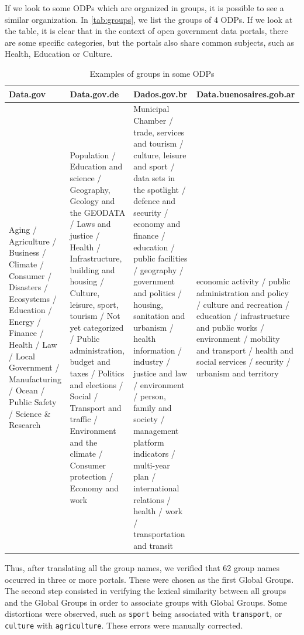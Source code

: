 If we look to some ODPs which are organized in groups, it is possible to see a similar organization.
In \autoref{tab:groups}, we list the groups of 4 ODPs. 
If we look at the table, it is clear that in the context of open government data portals, there are some specific categories, but the portals also share common subjects, such as Health, Education or Culture.

\begin{table}[]
\centering
\ABNTEXfontereduzida
\caption{Examples of groups in some ODPs}
\label{tab:groups}
\begin{tabular}{|p{3.2cm}|p{3.2cm}|p{3.2cm}|p{3.4cm}|}
\hline
Data.gov & Data.gov.de & Dados.gov.br & Data.buenosaires.gob.ar \\ \hline
Aging / Agriculture / Business / Climate / Consumer / Disasters / Ecosystems / Education / Energy / Finance / Health / Law / Local Government / Manufacturing / Ocean / Public Safety / Science \& Research &
Population / Education and science / Geography, Geology and the GEODATA / Laws and justice / Health / Infrastructure, building and housing / Culture, leisure, sport, tourism / Not yet categorized / Public administration, budget and taxes / Politics and elections / Social / Transport and traffic / Environment and the climate / Consumer protection / Economy and work &
Municipal Chamber
/ trade, services and tourism
/ culture, leisure and sport
/ data sets in the spotlight
/ defence and security
/ economy and finance
/ education
/ public facilities
/ geography
/ government and politics
/ housing, sanitation and urbanism
/ health information
/ industry
/ justice and law
/ environment
/ person, family and society
/ management platform indicators
/ multi-year plan
/ international relations
/ health
/ work
/ transportation and transit &
economic activity /
public administration and policy /
culture and recreation /
education /
infrastructure and public works /
environment /
mobility and transport /
health and social services /
security /
urbanism and territory \\\hline
\end{tabular}
\end{table}

Thus, after translating all the group names, we verified that 62 group names occurred in three or more portals.
These were chosen as the first Global Groups.
The second step consisted in verifying the lexical similarity between all groups and the Global Groups in order to associate groups with Global Groups.
Some distortions were observed, such as \texttt{sport} being associated with \texttt{transport}, or \texttt{culture} with \texttt{agriculture}.
These errors were manually corrected.

